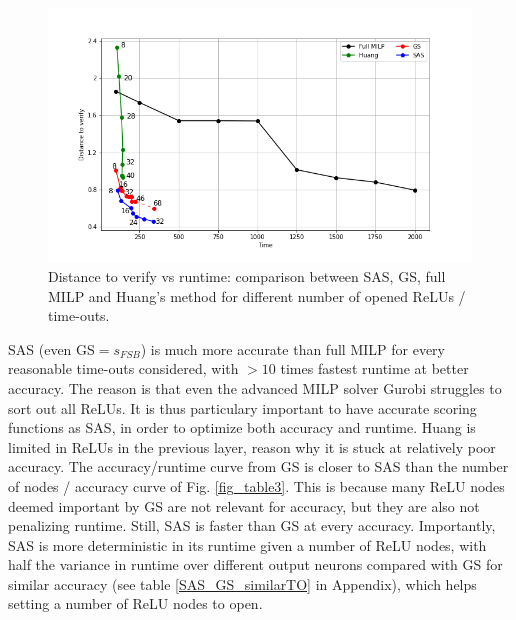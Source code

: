 \begin{figure}[t!]
	\includegraphics[scale=0.5]{CNN-B-ADV_layer7_comparison_image85_4methods.png}
	\caption{Distance to verify vs runtime: comparison between {\sf SAS}, GS, full MILP and Huang's method for different number of opened ReLUs / time-outs.}
	\label{fig555}
\end{figure}

{\sf SAS} (even {\sf GS}$=s_{FSB}$) is much more accurate than full MILP for every reasonable time-outs considered, with $>10$ times fastest runtime at better accuracy. The reason is that even the advanced MILP solver Gurobi struggles to sort out all ReLUs. It is thus particulary important to have accurate scoring functions as {\sf SAS}, in order to optimize both accuracy and runtime. Huang \cite{DivideAndSlide} is limited in ReLUs in the previous layer, reason why it is stuck at relatively poor accuracy. The accuracy/runtime curve from {\sf GS} is closer to {\sf SAS} than the number of nodes / accuracy curve of Fig. \ref{fig_table3}. This is because many ReLU nodes deemed important by {\sf GS} are not relevant for accuracy, but they are also not penalizing runtime. Still, {\sf SAS} is faster than {\sf GS} at  every accuracy. Importantly, {\sf SAS} is more deterministic in its runtime given a number of ReLU nodes, with half the variance in runtime over different output neurons compared with {\sf GS} for similar accuracy (see table \ref{SAS_GS_similarTO} in Appendix), which helps setting a number of ReLU nodes to open.




